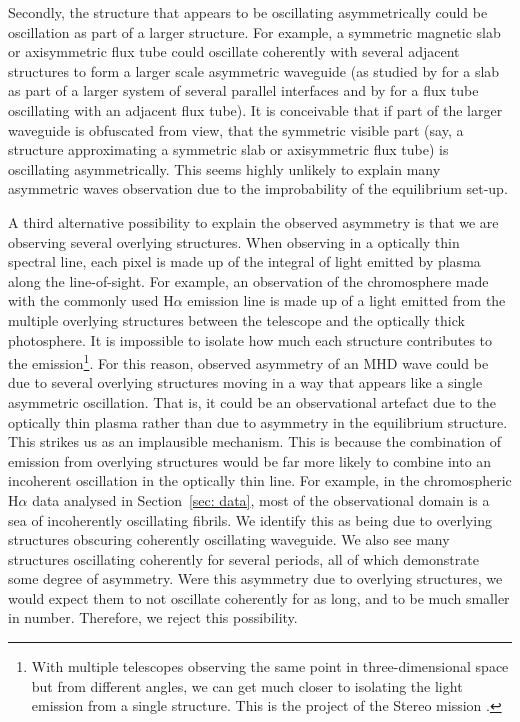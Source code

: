 \documentclass[12pt]{../style-files/ociamthesis}
\begin{document}
Secondly, the structure that appears to be oscillating asymmetrically could be oscillation as part of a larger structure. For example, a symmetric magnetic slab or axisymmetric flux tube could oscillate coherently with several adjacent structures to form a larger scale asymmetric waveguide (as studied by \cite{shu_etal18} for a slab as part of a larger system of several parallel interfaces and by \cite{van_etal08} for a flux tube oscillating with an adjacent flux tube). It is conceivable that if part of the larger waveguide is obfuscated from view, that the symmetric visible part (say, a structure approximating a symmetric slab or axisymmetric flux tube) is oscillating asymmetrically. This seems highly unlikely to explain many asymmetric waves observation due to the improbability of the equilibrium set-up.

A third alternative possibility to explain the observed asymmetry is that we are observing several overlying structures. When observing in a optically thin spectral line, each pixel is made up of the integral of light emitted by plasma along the line-of-sight. For example, an observation of the chromosphere made with the commonly used H$\alpha$ emission line is made up of a light emitted from the multiple overlying structures between the telescope and the optically thick photosphere. It is impossible to isolate how much each structure contributes to the emission\footnote{With multiple telescopes observing the same point in three-dimensional space but from different angles, we can get much closer to isolating the light emission from a single structure. This is the project of the Stereo mission \citep{stereo}.}. For this reason, observed asymmetry of an MHD wave could be due to several overlying structures moving in a way that appears like a single asymmetric oscillation. That is, it could be an observational artefact due to the optically thin plasma rather than due to asymmetry in the equilibrium structure. This strikes us as an implausible mechanism. This is because the combination of emission from overlying structures would be far more likely to combine into an incoherent oscillation in the optically thin line. For example, in the chromospheric H$\alpha$ data analysed in Section~\ref{sec: data}, most of the observational domain is a sea of incoherently oscillating fibrils. We identify this as being due to overlying structures obscuring coherently oscillating waveguide. We also see many  structures oscillating coherently for several periods, all of which demonstrate some degree of asymmetry. Were this asymmetry due to overlying structures, we would expect them to not oscillate coherently for as long, and to be much smaller in number. Therefore, we reject this possibility.
\end{document}
